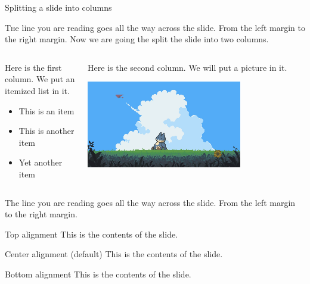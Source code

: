 \documentclass[10pt]{beamer}
\begin{document}
\begin{frame}{Splitting a slide into columns}

  \lettrine{T}he line you are reading goes all the way across the slide.
  From the left margin to the right margin.  Now we are going
  the split the slide into two columns.
  \bigskip
  
  \begin{columns}
    \begin{column}{0.5\textwidth}
      Here is the first column.  We put an itemized list in it.
      \begin{itemize}
        \item This is an item
        \item This is another item
        \item Yet another item
      \end{itemize}
    \end{column}
  
    \begin{column}{0.3\textwidth}
      Here is the second column.  We will put a picture in it.
      \centerline{\includegraphics[width=0.7\textwidth]{./pics/cover.png}}
    \end{column}
  \end{columns}
  \bigskip
  
  The line you are reading goes all the way across the slide.
  From the left margin to the right margin.
  \end{frame}

\begin{frame}[t]{Top alignment} 
  This is the contents of the slide. 
\end{frame} 
  
\begin{frame}[c]{Center alignment (default)} %
  This is the contents of the slide. 
\end{frame} 

\begin{frame}[b]{Bottom alignment} 
  This is the contents of the slide. 
\end{frame} 
\end{document}
